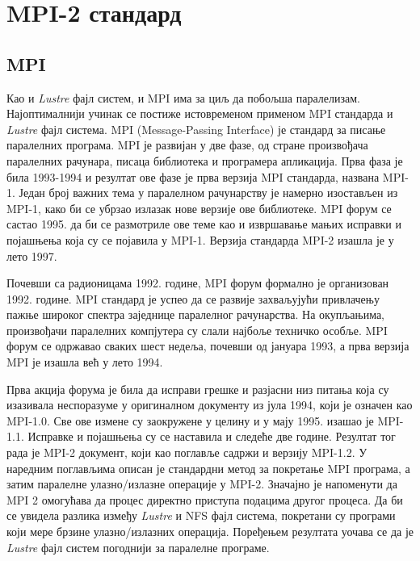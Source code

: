 \chapter{MPI-2 стандард}

\section{MPI}
Као и \textit{Lustre} фајл систем, и \gls{MPI} има за циљ да побољша паралелизам. Најоптималнији учинак се постиже истовременом применом MPI стандарда и \textit{Lustre} фајл система.
\gls{MPI} (Message-Passing Interface) је стандард за писање паралелних програма. MPI је развијан у две фазе, од стране произвођача паралелних рачунара, писаца библиотека и програмера апликација. Прва фаза је била 1993-1994 и резултат ове фазе је прва верзија MPI стандарда, названа  MPI-1. 
Један број важних тема у паралелном рачунарству је намерно изостављен из MPI-1, како би се убрзао излазак нове верзије ове библиотеке. MPI форум се састао 1995. да би се размотриле ове теме као и извршавање мањих исправки и појашњења која су се појавила у MPI-1. Верзија стандарда MPI-2 изашла је у лето 1997.

Почевши са радионицама 1992. године, MPI форум формално је организован 1992. године. MPI стандард је успео да се развије захваљујући привлачењу пажње широког спектра заједнице паралелног рачунарства. На окупљањима, произвођачи паралелних компјутера су слали најбоље техничко особље. MPI форум се одржавао сваких шест недеља, почевши од јануара 1993, а прва верзија MPI је изашла већ у лето 1994.

Прва акција форума је била да исправи грешке и разјасни низ питања која су изазивала неспоразуме у оригиналном документу из јула 1994, који је означен као MPI-1.0. Све ове измене су заокружене у целину и у мају 1995. изашао је MPI-1.1. Исправке и појашњења су се наставила и следеће две године. Резултат тог рада је MPI-2 документ, који као поглавље садржи и верзију MPI-1.2. 
У наредним поглављима описан је стандардни метод за покретање MPI програма, а затим паралелне улазно/излазне операције у MPI-2. Значајно је напоменути да MPI 2 омогућава да процес директно приступа подацима другог процеса.
Да би се увидела разлика између \textit{Lustre} и NFS фајл система, покретани су програми који мере брзине улазно/излазних операција. Поређењем резултата уочава се да је \textit{Lustre} фајл систем погоднији за паралелне програме.
\newpage

